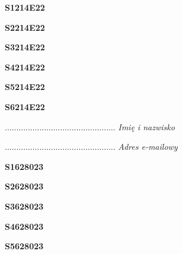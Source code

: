 \begin{turn}{90}\huge \textbf{S1214E22}\end{turn}

\begin{turn}{90}\huge \textbf{S2214E22}\end{turn}

\begin{turn}{90}\huge \textbf{S3214E22}\end{turn}

\begin{turn}{90}\huge \textbf{S4214E22}\end{turn}

\begin{turn}{90}\huge \textbf{S5214E22}\end{turn}

\begin{turn}{90}\huge \textbf{S6214E22}\end{turn}

\begin{turn}{90}\begin{minipage}{\linewidth} \vspace{20mm} ................................................  \textit{Imię i nazwisko}\end{minipage}\end{turn}

\begin{turn}{90}\begin{minipage}{\linewidth} \vspace{20mm} ................................................  \textit{Adres e-mailowy}\end{minipage}\end{turn}

\begin{turn}{90}\huge \textbf{S1628023}\end{turn}

\begin{turn}{90}\huge \textbf{S2628023}\end{turn}

\begin{turn}{90}\huge \textbf{S3628023}\end{turn}

\begin{turn}{90}\huge \textbf{S4628023}\end{turn}

\begin{turn}{90}\huge \textbf{S5628023}\end{turn}

